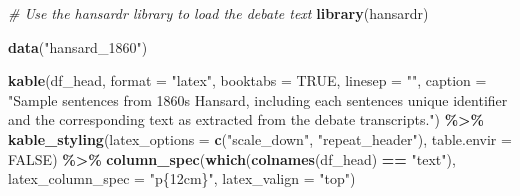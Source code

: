 \documentclass[
]{article}
\newenvironment{Shaded}{\begin{snugshade}}{\end{snugshade}}
\newcommand{\AttributeTok}[1]{\textcolor[rgb]{0.13,0.29,0.53}{#1}}
\newcommand{\CommentTok}[1]{\textcolor[rgb]{0.56,0.35,0.01}{\textit{#1}}}
\newcommand{\ConstantTok}[1]{\textcolor[rgb]{0.56,0.35,0.01}{#1}}
\newcommand{\FunctionTok}[1]{\textcolor[rgb]{0.13,0.29,0.53}{\textbf{#1}}}
\newcommand{\NormalTok}[1]{#1}
\newcommand{\SpecialCharTok}[1]{\textcolor[rgb]{0.81,0.36,0.00}{\textbf{#1}}}
\newcommand{\StringTok}[1]{\textcolor[rgb]{0.31,0.60,0.02}{#1}}
\begin{document}
\begin{Shaded}
\begin{Highlighting}[]
\CommentTok{\# Use the hansardr library to load the debate text}
\FunctionTok{library}\NormalTok{(hansardr)}

\FunctionTok{data}\NormalTok{(}\StringTok{"hansard\_1860"}\NormalTok{)}
\end{Highlighting}
\end{Shaded}

\begin{Shaded}
\begin{Highlighting}[]
\FunctionTok{kable}\NormalTok{(df\_head, }
      \AttributeTok{format =} \StringTok{"latex"}\NormalTok{, }
      \AttributeTok{booktabs =} \ConstantTok{TRUE}\NormalTok{, }
      \AttributeTok{linesep =} \StringTok{""}\NormalTok{,}
      \AttributeTok{caption =} \StringTok{"Sample sentences from 1860s Hansard, including each sentence\textquotesingle{}s }
\StringTok{                unique identifier and the corresponding text as extracted from the debate transcripts."}\NormalTok{) }\SpecialCharTok{\%\textgreater{}\%}
  \FunctionTok{kable\_styling}\NormalTok{(}\AttributeTok{latex\_options =} \FunctionTok{c}\NormalTok{(}\StringTok{"scale\_down"}\NormalTok{, }\StringTok{"repeat\_header"}\NormalTok{),}
                \AttributeTok{table.envir =} \ConstantTok{FALSE}\NormalTok{) }\SpecialCharTok{\%\textgreater{}\%}
  \FunctionTok{column\_spec}\NormalTok{(}\FunctionTok{which}\NormalTok{(}\FunctionTok{colnames}\NormalTok{(df\_head) }\SpecialCharTok{==} \StringTok{"text"}\NormalTok{), }
              \AttributeTok{latex\_column\_spec =} \StringTok{"p\{12cm\}"}\NormalTok{, }
              \AttributeTok{latex\_valign =} \StringTok{"top"}\NormalTok{)}
\end{Highlighting}
\end{Shaded}
\end{document}
